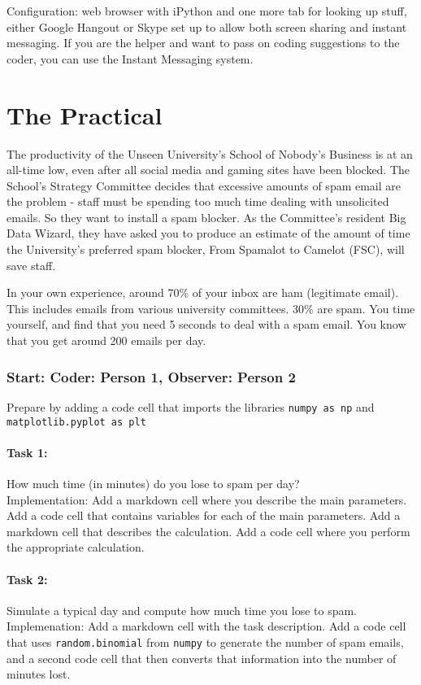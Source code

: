 \documentclass{article}
\begin{document}
Configuration: web browser with iPython and one more tab for looking up stuff, either Google Hangout or Skype set up to allow both screen sharing and instant messaging. If you are the helper and want to pass on coding suggestions to the coder, you can use the Instant Messaging system. 

\section{The Practical}

The productivity of the Unseen University's School of Nobody's Business is at an all-time low, even after all social media and gaming sites have been blocked. The School's Strategy Committee decides that excessive amounts of spam email are the problem - staff must be spending too much time dealing with unsolicited emails. So they want to install a spam blocker. As the Committee's resident Big Data Wizard, they have asked you to produce an estimate of the amount of time the University's preferred spam blocker, From Spamalot to Camelot (FSC), will save staff.

In your own experience, around 70\% of your inbox are ham (legitimate email). This includes emails from various university committees. 30\% are spam. You time yourself, and find that you need 5 seconds to deal with a spam email. You know that you get around 200 emails per day.

\subsubsection*{Start: Coder: Person 1, Observer: Person 2}

Prepare by adding a code cell that imports the libraries \texttt{numpy as np} and \texttt{matplotlib.pyplot as plt}

\paragraph{Task 1:} How much time (in minutes) do you lose to spam per day?\\
Implementation: Add a markdown cell where you describe the main parameters. Add a code cell that contains variables for each of the main parameters. Add a markdown cell that describes the calculation. Add a code cell where you perform the appropriate calculation. 

\paragraph{Task 2:} Simulate a typical day and compute how much time you lose to spam.\\
Implemenation: Add a markdown cell with the task description. Add a code cell that uses \texttt{random.binomial} from \texttt{numpy} to generate the number of spam emails, and a second code cell that then converts that information into the number of minutes lost.
\end{document}
